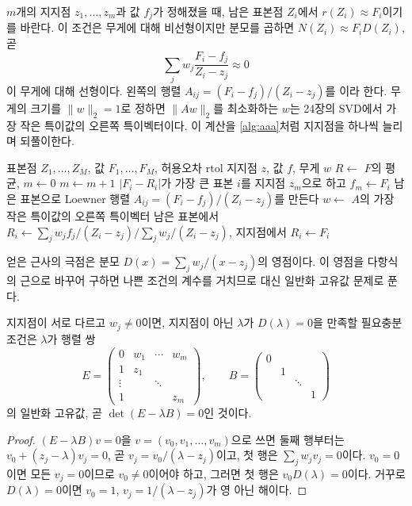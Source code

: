 $m$개의 지지점 $z_1,\dots,z_m$과 값 $f_j$가 정해졌을 때, 남은 표본점 $Z_i$에서 $r(Z_i)\approx F_i$이기를 바란다. 이 조건은 무게에 대해 비선형이지만 분모를 곱하면 $N(Z_i)\approx F_iD(Z_i)$, 곧
\[
\sum_jw_j\frac{F_i-f_j}{Z_i-z_j}\approx0
\]
이 무게에 대해 선형이다. 왼쪽의 행렬 $A_{ij}=(F_i-f_j)/(Z_i-z_j)$를 이라 한다. 무게의 크기를 $\|w\|_2=1$로 정하면 $\|Aw\|_2$를 최소화하는 $w$는 24장의 SVD에서 가장 작은 특이값의 오른쪽 특이벡터이다. 이 계산을 \cref{alg:aaa}처럼 지지점을 하나씩 늘리며 되풀이한다.

\begin{algorithm}[t]
\begin{algorithmic}[1]
\Require 표본점 $Z_1,\dots,Z_M$, 값 $F_1,\dots,F_M$, 허용오차 $\mathrm{rtol}$
\Ensure 지지점 $z$, 값 $f$, 무게 $w$
\State $R\gets$ $F$의 평균, $m\gets0$
\Repeat
  \State $m\gets m+1$
  \State $|F_i-R_i|$가 가장 큰 표본 $i$를 지지점 $z_m$으로 하고 $f_m\gets F_i$ 
  \State 남은 표본으로 Loewner 행렬 $A_{ij}=(F_i-f_j)/(Z_i-z_j)$를 만든다
  \State $w\gets$ $A$의 가장 작은 특이값의 오른쪽 특이벡터
  \State 남은 표본에서 $R_i\gets\sum_jw_jf_j/(Z_i-z_j)\big/\sum_jw_j/(Z_i-z_j)$, 지지점에서 $R_i\gets F_i$
\end{algorithmic}
\caption{AAA 알고리즘}
\label{alg:aaa}
\end{algorithm}

얻은 근사의 극점은 분모 $D(x)=\sum_jw_j/(x-z_j)$의 영점이다. 이 영점을 다항식의 근으로 바꾸어 구하면 나쁜 조건의 계수를 거치므로 대신 일반화 고유값 문제로 푼다.

\begin{proposition}
\label{prop:aaa-poles}
지지점이 서로 다르고 $w_j\ne0$이면, 지지점이 아닌 $\lambda$가 $D(\lambda)=0$을 만족할 필요충분조건은 $\lambda$가 행렬 쌍
\[
E=\begin{pmatrix}0&w_1&\cdots&w_m\\1&z_1&&\\\vdots&&\ddots&\\1&&&z_m\end{pmatrix},\qquad B=\begin{pmatrix}0&&&\\&1&&\\&&\ddots&\\&&&1\end{pmatrix}
\]
의 일반화 고유값, 곧 $\det(E-\lambda B)=0$인 것이다.
\end{proposition}

\begin{proof}
$(E-\lambda B)v=0$을 $v=(v_0,v_1,\dots,v_m)$으로 쓰면 둘째 행부터는 $v_0+(z_j-\lambda)v_j=0$, 곧 $v_j=v_0/(\lambda-z_j)$이고, 첫 행은 $\sum_jw_jv_j=0$이다. $v_0=0$이면 모든 $v_j=0$이므로 $v_0\ne0$이어야 하고, 그러면 첫 행은 $v_0D(\lambda)=0$이다. 거꾸로 $D(\lambda)=0$이면 $v_0=1$, $v_j=1/(\lambda-z_j)$가 영 아닌 해이다.
\end{proof}

